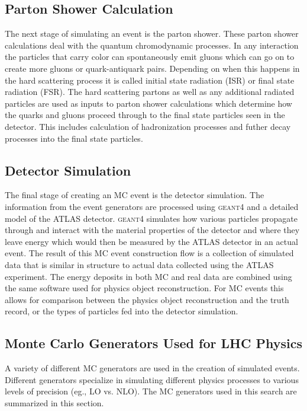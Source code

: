\subsection{Parton Shower Calculation}
The next stage of simulating an event is the parton shower.  These parton shower calculations deal with the quantum chromodynamic processes.  In any interaction the particles that carry color can spontaneously emit gluons which can go on to create more gluons or quark-antiquark pairs.  Depending on when this happens in the hard scattering process it is called initial state radiation (ISR) or final state radiation (FSR).   The hard scattering partons as well as any additional radiated particles are used as inputs to parton shower calculations which determine how the quarks and gluons proceed through to the final state particles seen in the detector.  This includes calculation of hadronization processes and futher decay processes into the final state particles.

\subsection{Detector Simulation}
The final stage of creating an MC event is the detector simulation.  The information from the event generators are processed using \textsc{geant4} \cite{Geant4} and a detailed model of the ATLAS detector.  \textsc{geant4} simulates how various particles propagate through and interact with the material properties of the detector and where they leave energy which would then be measured by the ATLAS detector in an actual event.  The result of this MC event construction flow is a collection of simulated data that is similar in structure to actual data collected using the ATLAS experiment.  The energy deposits in both MC and real data are combined using the same software used for physics object reconstruction.  For MC events this allows for comparison between the physics object reconstruction and the truth record, or the types of particles fed into the detector simulation.

\subsection{Monte Carlo Generators Used for LHC Physics}

A variety of different MC generators are used in the creation of simulated events.  Different generators specialize in simulating different physics processes to various levels of precision (eg., LO vs. NLO). The MC generators used in this search are summarized in this section.

